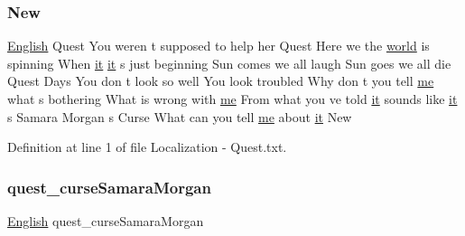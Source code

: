 \subsubsection{\texorpdfstring{New}{New}}
{\footnotesize\ttfamily \mbox{\hyperlink{_sphere_i_i_01_winter_01_project_2_config_2_localization_8txt_ad896b63205779b1b09e86d941ce13976}{English}} Quest You weren t supposed to help her Quest Here we the \mbox{\hyperlink{_sphere_i_i_01_music_01_boxes_2_config_2_localization_8txt_a7ede01351426b1b7f6c1ce5f794e474f}{world}} is spinning When \mbox{\hyperlink{_the_01_restless_01_curse_2_config_2_localization_01-_01_quest_8txt_a741b285909bea4855b886664c2dcd50c}{it}} \mbox{\hyperlink{_the_01_restless_01_curse_2_config_2_localization_01-_01_quest_8txt_a741b285909bea4855b886664c2dcd50c}{it}} s just beginning Sun comes we all laugh Sun goes we all die Quest Days You don t look so well You look troubled Why don t you tell \mbox{\hyperlink{_blooms_01_animal_01_husbandry_2_config_2_localization_8txt_a290fbecf7c016b09bc675718400d6fca}{me}} what s bothering What is wrong with \mbox{\hyperlink{_blooms_01_animal_01_husbandry_2_config_2_localization_8txt_a290fbecf7c016b09bc675718400d6fca}{me}} From what you ve told \mbox{\hyperlink{_the_01_restless_01_curse_2_config_2_localization_01-_01_quest_8txt_a741b285909bea4855b886664c2dcd50c}{it}} sounds like \mbox{\hyperlink{_the_01_restless_01_curse_2_config_2_localization_01-_01_quest_8txt_a741b285909bea4855b886664c2dcd50c}{it}} s Samara Morgan s Curse What can you tell \mbox{\hyperlink{_blooms_01_animal_01_husbandry_2_config_2_localization_8txt_a290fbecf7c016b09bc675718400d6fca}{me}} about \mbox{\hyperlink{_the_01_restless_01_curse_2_config_2_localization_01-_01_quest_8txt_a741b285909bea4855b886664c2dcd50c}{it}} New}



Definition at line 1 of file Localization -\/ Quest.\+txt.

\mbox{\label{_the_01_restless_01_curse_2_config_2_localization_01-_01_quest_8txt_aa5852d37d4ce0ab8ea2caa15bd175566}} 
\subsubsection{\texorpdfstring{quest\_curseSamaraMorgan}{quest\_curseSamaraMorgan}}
{\footnotesize\ttfamily \mbox{\hyperlink{_sphere_i_i_01_winter_01_project_2_config_2_localization_8txt_ad896b63205779b1b09e86d941ce13976}{English}} quest\+\_\+curse\+Samara\+Morgan}




